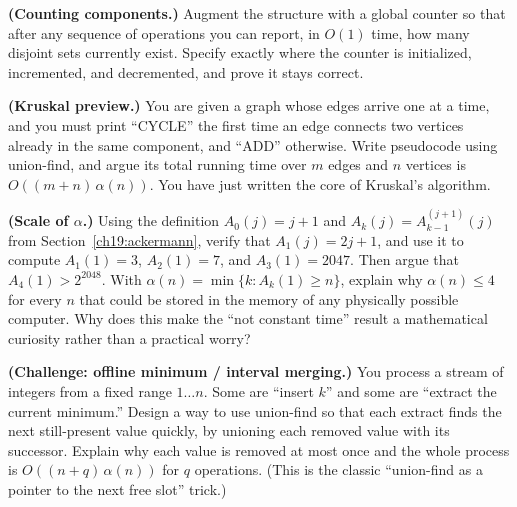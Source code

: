 \begin{exercise}
\textbf{(Counting components.)} Augment the structure with a global counter so
that after any sequence of operations you can report, in $O(1)$ time, how many
disjoint sets currently exist. Specify exactly where the counter is initialized,
incremented, and decremented, and prove it stays correct.
\end{exercise}

\begin{exercise}
\textbf{(Kruskal preview.)} You are given a graph whose edges arrive one at a
time, and you must print ``CYCLE'' the first time an edge connects two vertices
already in the same component, and ``ADD'' otherwise. Write pseudocode using
union-find, and argue its total running time over $m$ edges and $n$ vertices is
$O((m+n)\,\alpha(n))$. You have just written the core of Kruskal's algorithm.
\end{exercise}

\begin{exercise}
\textbf{(Scale of $\alpha$.)} Using the definition
$A_0(j) = j+1$ and $A_k(j) = A_{k-1}^{(j+1)}(j)$ from
Section~\ref{ch19:ackermann}, verify that $A_1(j) = 2j+1$, and use it to compute
$A_1(1) = 3$, $A_2(1) = 7$, and $A_3(1) = 2047$. Then argue that
$A_4(1) > 2^{2048}$. With $\alpha(n) = \min\{k : A_k(1) \ge n\}$, explain why
$\alpha(n) \le 4$ for every $n$ that could be stored
in the memory of any physically possible computer. Why does this make the
``not constant time'' result a mathematical curiosity rather than a practical
worry?
\end{exercise}

\begin{exercise}
\textbf{(Challenge: offline minimum / interval merging.)} You process a stream
of integers from a fixed range $1 \dots n$. Some are ``insert $k$'' and some are
``extract the current minimum.'' Design a way to use union-find so that each
extract finds the next still-present value quickly, by unioning each removed
value with its successor. Explain why each value is removed at most once and the
whole process is $O((n + q)\,\alpha(n))$ for $q$ operations. (This is the
classic ``union-find as a pointer to the next free slot'' trick.)
\end{exercise}
